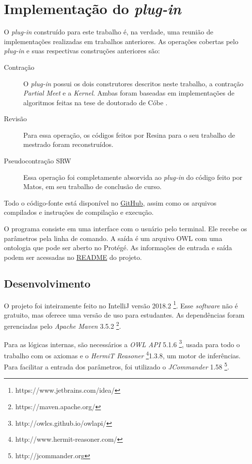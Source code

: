 \chapter{Implementação do \textit{plug-in}}
\label{chap:implementacao}

O \textit{plug-in} construído para este trabalho é, na verdade, uma reunião de implementações realizadas em trabalhos anteriores. As operações cobertas pelo \textit{plug-in} e suas respectivas construções anteriores são:

\begin{description}
	\item[Contração] O \textit{plug-in} possui os dois construtores descritos neste trabalho, a contração \textit{Partial Meet} e a \textit{Kernel}. Ambas foram baseadas em implementações de algoritmos feitas na tese de doutorado de Cóbe \cite{revisaoCobe}.
	\item[Revisão] Para essa operação, os códigos feitos por Resina para o seu trabalho de mestrado \cite{logicaResina} foram reconstruídos. 
	\item[Pseudocontração SRW] Essa operação foi completamente absorvida ao \textit{plug-in} do código feito por Matos, em seu trabalho de conclusão de curso. \cite{logicaMatos}
\end{description} 

Todo o código-fonte está disponível no \href{https://github.com/lsflp/ontology-repair/}{GitHub}, assim como os arquivos
compilados e instruções de compilação e execução.

O programa consiste em uma interface com o usuário pelo terminal. Ele recebe os parâmetros pela linha de comando. A saída é um arquivo OWL com uma ontologia que pode ser aberto no Protégé. As informações de entrada e saída podem ser acessadas no \href{https://github.com/lsflp/ontology-repair/blob/master/README.md}{README} do projeto.

\section{Desenvolvimento}

O projeto foi inteiramente feito no IntelliJ versão 2018.2 \footnote{https://www.jetbrains.com/idea/}. Esse \textit{software} não é gratuito, mas oferece uma versão de uso para estudantes. As dependências foram gerenciadas pelo \textit{Apache Maven} 3.5.2 \footnote{https://maven.apache.org/}.

Para as lógicas internas, são necessários a \textit{OWL API} 5.1.6 \footnote{http://owlcs.github.io/owlapi/}, usada para todo o trabalho com os axiomas e o \textit{HermiT Reasoner} \footnote{http://www.hermit-reasoner.com/}1.3.8, um motor de inferências. Para facilitar a entrada dos parâmetros, foi utilizado o \textit{JCommander} 1.58 \footnote{http://jcommander.org}.


